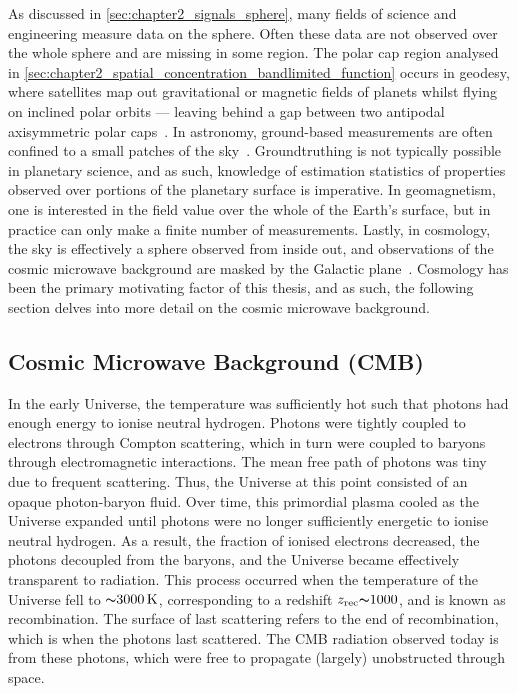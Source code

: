As discussed in \cref{sec:chapter2_signals_sphere}, many fields of science and engineering measure data on the sphere.
Often these data are not observed over the whole sphere and are missing in some region.
The polar cap region analysed in \cref{sec:chapter2_spatial_concentration_bandlimited_function} occurs in geodesy, where satellites map out gravitational or magnetic fields of planets whilst flying on inclined polar orbits --- leaving behind a gap between two antipodal axisymmetric polar caps~\cite{Simons2006a}.
In astronomy, ground-based measurements are often confined to a small patches of the sky~\cite{Peebles1973,Tegmark1995}.
Groundtruthing is not typically possible in planetary science, and as such, knowledge of estimation statistics of properties observed over portions of the planetary surface is imperative.
In geomagnetism, one is interested in the field value over the whole of the Earth's surface, but in practice can only make a finite number of measurements.
Lastly, in cosmology, the sky is effectively a sphere observed from inside out, and observations of the cosmic microwave background are masked by the Galactic plane~\cite{Tegmark1996,Hinshaw2003}.
Cosmology has been the primary motivating factor of this thesis, and as such, the following section delves into more detail on the cosmic microwave background.

\subsection{Cosmic Microwave Background (CMB)}\label{sec:chapter2_cosmic_microwave_background}

In the early Universe, the temperature was sufficiently hot such that photons had enough energy to ionise neutral hydrogen.
Photons were tightly coupled to electrons through Compton scattering, which in turn were coupled to baryons through electromagnetic interactions.
The mean free path of photons was tiny due to frequent scattering.
Thus, the Universe at this point consisted of an opaque photon-baryon fluid.
Over time, this primordial plasma cooled as the Universe expanded until photons were no longer sufficiently energetic to ionise neutral hydrogen.
As a result, the fraction of ionised electrons decreased, the photons decoupled from the baryons, and the Universe became effectively transparent to radiation.
This process occurred when the temperature of the Universe fell to \({\thicksim}\SI{3000}{\kelvin}\), corresponding to a redshift \(z_{\text{rec}} {\thicksim}1000\), and is known as recombination.
The surface of last scattering refers to the end of recombination, which is when the photons last scattered.
The CMB radiation observed today is from these photons, which were free to propagate (largely) unobstructed through space.

